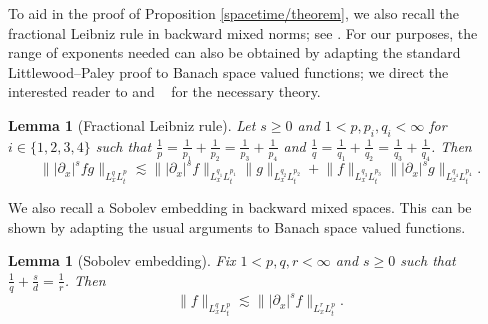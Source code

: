 \documentclass[10pt, reqno]{amsart}
\numberwithin{equation}{section}
\newtheorem{lemma}[theorem]{Lemma}
\theoremstyle{definition}
\theoremstyle{remark}
\begin{document}
    To aid in the proof of Proposition \ref{spacetime/theorem},  we also recall the fractional Leibniz rule in backward mixed norms; see \cite[Theorem A.8]{KPV93}. For our purposes, the range of exponents needed can also be obtained by adapting the standard Littlewood--Paley proof to Banach space valued functions; we direct the interested reader to \cite{operator-valued} and ~\cite[$\S$1.6.4]{Stein93} for the necessary theory.
    \begin{lemma}[Fractional Leibniz rule]\label{proof/leibniz}
        Let $s \geq 0$ and $1 < p,p_i,q_i < \infty$ for $i \in \{1,2,3,4\}$ such that $\frac{1}{p} = \frac{1}{p_1} + \frac{1}{p_2} = \frac{1}{p_3} + \frac{1}{p_4}$ and $\frac{1}{q} = \frac{1}{q_1} + \frac{1}{q_2} = \frac{1}{q_3} + \frac{1}{q_4}$. Then
        \begin{equation*}
            \big\| |\partial_x|^s fg \big\|_{L_x^{q} L_t^{p}} \lesssim \big\| |\partial_x|^sf\big\|_{L_x^{q_1} L_t^{p_1}}\big\| g \big\|_{L_x^{q_2} L_t^{p_2}} + \big\| f \big\|_{L_x^{q_3} L_t^{p_3}}\big\| |\partial_x|^sg \big\|_{L_x^{q_4} L_t^{p_4}}.
        \end{equation*}
    \end{lemma}
    
    We also recall a Sobolev embedding in backward mixed spaces. This can be shown by adapting the usual arguments to Banach space valued functions.
    \begin{lemma}[Sobolev embedding]\label{proof/sobolev}
        Fix $1 < p,q,r < \infty$ and $s \geq 0$ such that $\frac{1}{q} + \frac{s}{d} = \frac{1}{r}$. Then
        \begin{equation*}
            \|f\|_{L_x^q L_t^p} \lesssim \big\||\partial_x|^s f\big\|_{L_x^r L_t^p}.
        \end{equation*}
    \end{lemma}
\end{document}
